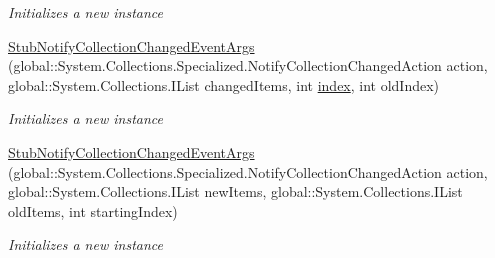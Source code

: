 \begin{DoxyCompactItemize}
\begin{DoxyCompactList}\small\item\em Initializes a new instance\end{DoxyCompactList}\item 
\hyperlink{class_system_1_1_collections_1_1_specialized_1_1_fakes_1_1_stub_notify_collection_changed_event_args_a33f58c6041418671b40592866a21e8a6}{Stub\-Notify\-Collection\-Changed\-Event\-Args} (global\-::\-System.\-Collections.\-Specialized.\-Notify\-Collection\-Changed\-Action action, global\-::\-System.\-Collections.\-I\-List changed\-Items, int \hyperlink{jquery-1_810_82-vsdoc_8js_a75bb12d1f23302a9eea93a6d89d0193e}{index}, int old\-Index)
\begin{DoxyCompactList}\small\item\em Initializes a new instance\end{DoxyCompactList}\item 
\hyperlink{class_system_1_1_collections_1_1_specialized_1_1_fakes_1_1_stub_notify_collection_changed_event_args_accbfc37fef82afb1cdbf1e56719249bf}{Stub\-Notify\-Collection\-Changed\-Event\-Args} (global\-::\-System.\-Collections.\-Specialized.\-Notify\-Collection\-Changed\-Action action, global\-::\-System.\-Collections.\-I\-List new\-Items, global\-::\-System.\-Collections.\-I\-List old\-Items, int starting\-Index)
\begin{DoxyCompactList}\small\item\em Initializes a new instance\end{DoxyCompactList}\end{DoxyCompactItemize}
